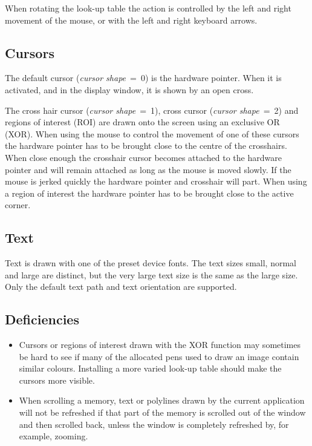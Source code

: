 When rotating the look-up table the action is controlled by the left
and right movement of the mouse, or with the left and right keyboard
arrows.

\subsection{Cursors}

The default cursor ({\it cursor shape}~=~0) is the hardware pointer. When
it is activated, and in the display window, it is shown by an open cross.

The cross hair cursor ({\it cursor shape}~=~1), cross cursor ({\it cursor
shape}~=~2) and regions of interest (ROI) are drawn onto the screen using
an exclusive OR (XOR).
When using the mouse to control the movement of one of these cursors the
hardware pointer has to be brought close to the centre of the crosshairs.
When close enough the crosshair cursor becomes attached to the hardware
pointer and will remain attached as long as the mouse is moved slowly.
If the mouse is jerked quickly the hardware pointer and crosshair
will part. When using a region of interest the hardware pointer has
to be brought close to the active corner.

\subsection{Text}

Text is drawn with one of the preset device fonts. The text sizes small,
normal and large are distinct, but the very large text size is the same
as the large size. Only the default text path and text orientation are
supported.

\subsection{Deficiencies}

\begin{itemize}
\item
Cursors or regions of interest drawn with the XOR function may sometimes
be hard to see if many of the allocated pens used to draw an image contain
similar colours. Installing a more varied look-up table should make the
cursors more visible.

\item
When scrolling a memory, text or polylines drawn by the current application
will not be refreshed if that part of the memory is scrolled out of the
window and then scrolled back, unless the window is completely refreshed by,
for example, zooming.
\end{itemize}




